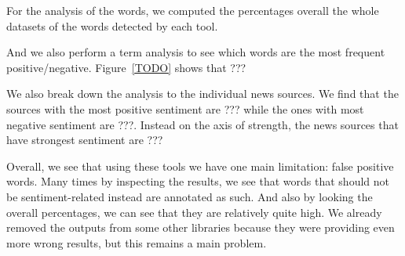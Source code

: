 For the analysis of the words, we computed the percentages overall the whole datasets of the words detected by each tool.

And we also perform a term analysis to see which words are the most frequent positive/negative. Figure~\ref{TODO} shows that ???

We also break down the analysis to the individual news sources.
We find that the sources with the most positive sentiment are ??? while the ones with most negative sentiment are ???.
Instead on the axis of strength, the news sources that have strongest sentiment are ???


Overall, we see that using these tools we have one main limitation: false positive words. Many times by inspecting the results, we see that words that should not be sentiment-related instead are annotated as such. And also by looking the overall percentages, we can see that they are relatively quite high.
We already removed the outputs from some other libraries because they were providing even more wrong results, but this remains a main problem.






